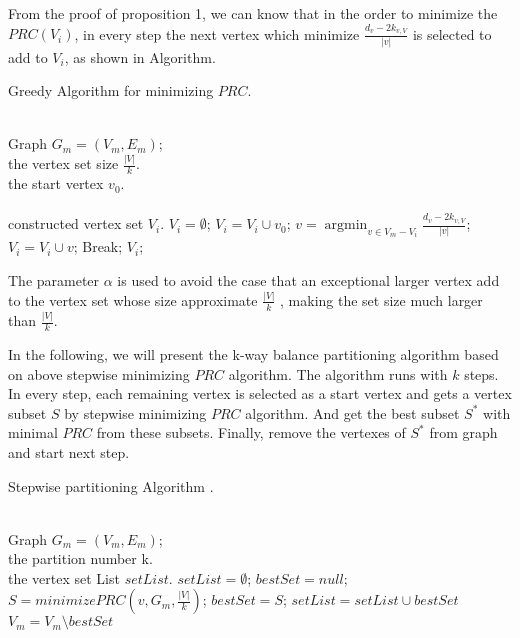 \documentclass{acm_proc_article-sp}
\DeclareMathOperator*{\argmin}{argmin}
\begin{document}
From the proof of proposition 1, we can know that in the order to minimize the $PRC(V_{i})$, in every step the next vertex which minimize $\frac {d_{v}-2k_{v,V}}{|v|}$  is selected to add to $V_{i}$, as shown in Algorithm.
\begin{algorithm}[htb]
\caption{Greedy Algorithm for minimizing $PRC$.}
\label{algo:greedy}
\begin{algorithmic}[1]
\REQUIRE ~~\\
Graph $G_{m}=(V_{m},E_{m})$;\\
the vertex set size $\frac{|V|}{k}$.\\
the start vertex $v_{0}$.\\
\ENSURE ~~\\
constructed vertex set $V_{i}$.
\STATE $V_{i}=\emptyset$;
\STATE $V_{i}=V_{i}\cup v_{0}$;
    \STATE $v=\mathop{\argmin}_{v \in V_{m}-V_{i}}{\frac{d_{v}-2k_{v,V}}{|v|}}$;
    \STATE $V_{i}=V_{i}\cup{v}$;
    \ELSE
    \STATE Break;
    \ENDIF
    \ENDIF
\ENDWHILE
\RETURN $V_{i}$;
\end{algorithmic}
\end{algorithm}
The parameter $\alpha$ is used to avoid the case that an exceptional larger vertex add to the vertex set whose size approximate $\frac{|V|}{k}$ , making the set size much larger than  $\frac{|V|}{k}$.
\par
In the following, we will present the k-way balance partitioning algorithm based on above stepwise minimizing $PRC$ algorithm. The algorithm runs with $k$ steps. In every step, each remaining vertex is selected as a start vertex and gets a vertex subset $S$ by stepwise minimizing $PRC$ algorithm. And get the best subset $S^{*}$ with minimal $PRC$ from these subsets. Finally, remove the vertexes of $S^{*}$ from graph and start next step.
\begin{algorithm}[htb]
\caption{Stepwise partitioning Algorithm .}
\label{algo:par}
\begin{algorithmic}[1]
\REQUIRE ~~\\
Graph $G_{m}=(V_{m},E_{m})$;\\
the partition number k.
\ENSURE ~~\\
the vertex set List $setList$.
\STATE $setList=\emptyset$;
\STATE $bestSet=null$;
            \STATE $S=minimizePRC(v,G_{m},\frac{|V|}{k})$;
                \STATE $bestSet=S$;
              \ENDIF
     \ENDFOR
       \STATE $setList=setList\cup bestSet$
       \STATE $V_{m}=V_{m}\setminus bestSet$
   \ENDFOR


\end{algorithmic}
\end{algorithm}
\end{document}
